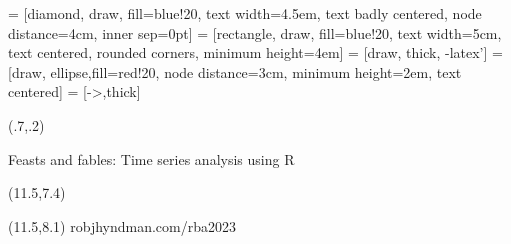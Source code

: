 
\usepackage{bm,booktabs,animate,ragged2e,multicol,microtype,hyperref,alltt}

\fontsize{13}{15}\sf
\usepackage[scale=0.85]{sourcecodepro}
\usepackage{fontawesome}

\usetikzlibrary{trees,shapes,arrows,matrix}
 = [diamond, draw, fill=blue!20,
    text width=4.5em, text badly centered, node distance=4cm, inner sep=0pt]
 = [rectangle, draw, fill=blue!20,
    text width=5cm, text centered, rounded corners, minimum height=4em]
 = [draw, thick, -latex']
 = [draw, ellipse,fill=red!20, node distance=3cm,
    minimum height=2em, text centered]
 = [->,thick]

\graphicspath{{figs/}}

{
\begin{textblock}{7.5}(.7,.2)\fontsize{24}{26}\sf
{\color{MonashBlue}\raggedright{}\par Feasts and fables: Time series analysis using R}
\end{textblock}
\begin{textblock}{7.5}(11.5,7.4)
{\fontsize{15}{15}\sf\color[RGB]{45,27,15}\bfseries\raggedright{\insertauthor}}
\end{textblock}
\begin{textblock}{7.5}(11.5,8.1)
{\fontsize{9}{9}\sf\color[RGB]{45,27,15}robjhyndman.com/rba2023}
\end{textblock}
}

\def\E{\text{E}}
\def\V{\text{Var}}
\def\bY{\bm{y}}
\def\by{\bm{y}}
\def\bS{\bm{S}}
\def\bG{\bm{G}}
\def\bW{\bm{W}}
\def\bSigma{\bm{\Sigma}}
\def\Var{\text{Var}}
\def\var{\text{Var}}
\newcommand{\btwocol}{\begin{multicols}{2}}
\newcommand{\etwocol}{\end{multicols}}
\def\pred#1#2#3{\hat{#1}_{#2|#3}}
\def\damped{$_\text{d}$}

\def\forecast{\begin{alertblock}{}\fontsize{10}{11}\sf
A forecast is an estimate of the probability distribution of a variable to be observed in the future.
\end{alertblock}}
\def\simfutures{\begin{textblock}{2.7}(13,7.7)
\begin{block}{}\fontsize{10}{11}\sf
Simulated futures from an ETS model
\end{block}\end{textblock}}
